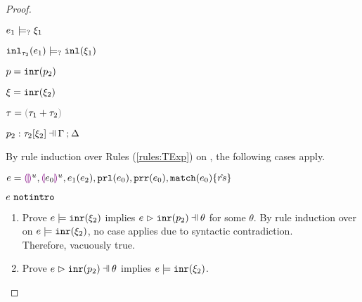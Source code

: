 \begin{proof}
\begin{byCases}
\begin{byCases}
\begin{enumerate}
\begin{byCases}
\begin{pfsteps*}
                \item $e_1 \models_{?} \xi_1$  
                \item $\mathtt{inl}_{\tau_2}({e_1}) \models_{?} \mathtt{inl}(\xi_1)$ 
                \end{pfsteps*}
            \end{byCases}
        \end{enumerate}
    \end{byCases}
\item[\text{(\ref{rule:PTInr})}]
    \begin{pfsteps*}
    \item $p=\mathtt{inr}(p_2)$ 
    \item $\xi=\mathtt{inr}(\xi_2)$ 
    \item $\tau=\tsum{\tau_1}{\tau_2}$ 
    \item $\chpattyp{p_2}{\tau_2}{\xi_2}{\Gamma}{\Delta}$  
    \end{pfsteps*}
    By rule induction over Rules (\ref{rules:TExp}) on , the following cases apply.
    \begin{byCases}
    \item[\text{(\ref{rule:TEHole}),(\ref{rule:THole}),(\ref{rule:TAp}),(\ref{rule:TPrl}),(\ref{rule:TPrr}),(\ref{rule:TMatchZPre}),(\ref{rule:TMatchNZPre})}]
        \begin{pfsteps*}
        \item $e=\textcolor{violet}{\llparenthesis}\textcolor{violet}{\rrparenthesis}^{u},\textcolor{violet}{\llparenthesis} e_0\textcolor{violet}{\rrparenthesis}^{u},e_1(e_2),\mathtt{prl}(e_0),\mathtt{prr}(e_0),\mathtt{match}(e_0) \{\hat{rs}\}$ 
        \item $e ~\mathtt{notintro}$  
        \end{pfsteps*}
        \begin{enumerate}
        \item Prove $e \models \mathtt{inr}(\xi_2)$ implies $\hpatmatch{e}{\hinrp{p_2}}{\theta}$ for some $\theta$.
        By rule induction over  on $e \models \mathtt{inr}(\xi_2)$, no case applies due to syntactic contradiction. \\ Therefore, vacuously true.
        \item Prove $\hpatmatch{e}{\hinrp{p_2}}{\theta}$ implies $e \models \mathtt{inr}(\xi_2)$.

\end{enumerate}
\end{byCases}
\end{byCases}
\end{proof}

